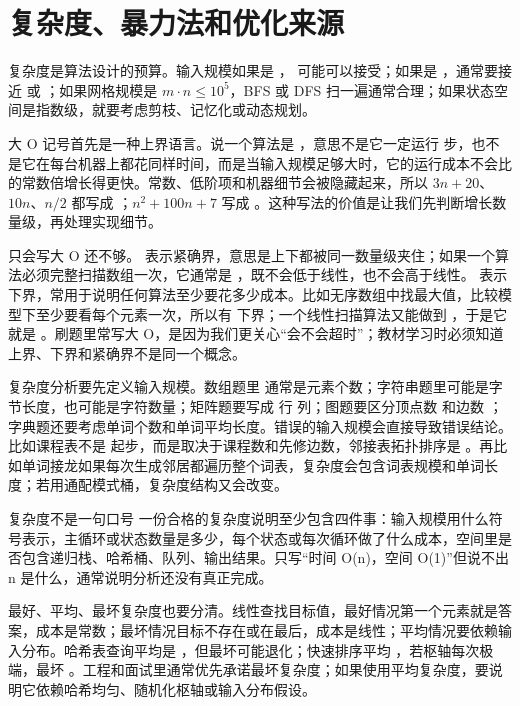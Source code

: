 \section{复杂度、暴力法和优化来源}

复杂度是算法设计的预算。输入规模如果是 ， 可能可以接受；如果是 ，通常要接近  或 ；如果网格规模是 \ensuremath{m \cdot n \le 10^5}，BFS 或 DFS 扫一遍通常合理；如果状态空间是指数级，就要考虑剪枝、记忆化或动态规划。

大 O 记号首先是一种上界语言。说一个算法是 ，意思不是它一定运行  步，也不是它在每台机器上都花同样时间，而是当输入规模足够大时，它的运行成本不会比  的常数倍增长得更快。常数、低阶项和机器细节会被隐藏起来，所以 \ensuremath{3n + 20}、\ensuremath{10n}、\ensuremath{n / 2} 都写成 ；\ensuremath{n^2 + 100n + 7} 写成 。这种写法的价值是让我们先判断增长数量级，再处理实现细节。

只会写大 O 还不够。  表示紧确界，意思是上下都被同一数量级夹住；如果一个算法必须完整扫描数组一次，它通常是 ，既不会低于线性，也不会高于线性。  表示下界，常用于说明任何算法至少要花多少成本。比如无序数组中找最大值，比较模型下至少要看每个元素一次，所以有  下界；一个线性扫描算法又能做到 ，于是它就是 。刷题里常写大 O，是因为我们更关心“会不会超时”；教材学习时必须知道上界、下界和紧确界不是同一个概念。

复杂度分析要先定义输入规模。数组题里  通常是元素个数；字符串题里可能是字节长度，也可能是字符数量；矩阵题要写成  行  列；图题要区分顶点数  和边数 ；字典题还要考虑单词个数和单词平均长度。错误的输入规模会直接导致错误结论。比如课程表不是  起步，而是取决于课程数和先修边数，邻接表拓扑排序是 。再比如单词接龙如果每次生成邻居都遍历整个词表，复杂度会包含词表规模和单词长度；若用通配模式桶，复杂度结构又会改变。

\begin{principlebox}{复杂度不是一句口号}
一份合格的复杂度说明至少包含四件事：输入规模用什么符号表示，主循环或状态数量是多少，每个状态或每次循环做了什么成本，空间里是否包含递归栈、哈希桶、队列、输出结果。只写“时间 O(n)，空间 O(1)”但说不出 n 是什么，通常说明分析还没有真正完成。
\end{principlebox}

最好、平均、最坏复杂度也要分清。线性查找目标值，最好情况第一个元素就是答案，成本是常数；最坏情况目标不存在或在最后，成本是线性；平均情况要依赖输入分布。哈希表查询平均是 ，但最坏可能退化；快速排序平均 ，若枢轴每次极端，最坏 。工程和面试里通常优先承诺最坏复杂度；如果使用平均复杂度，要说明它依赖哈希均匀、随机化枢轴或输入分布假设。

